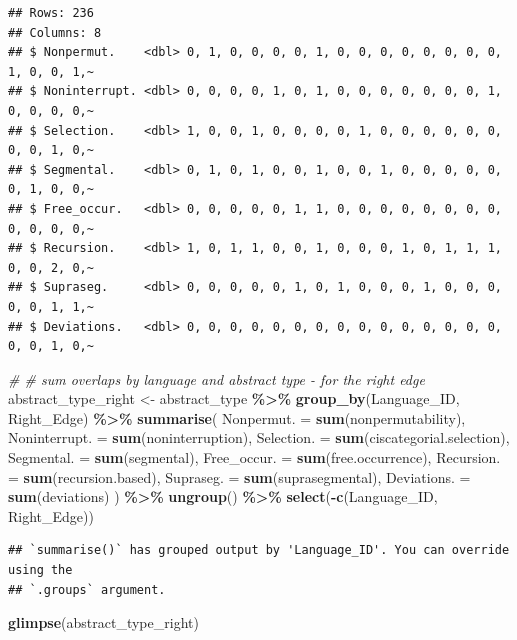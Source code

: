 \documentclass[
]{article}
\newenvironment{Shaded}{\begin{snugshade}}{\end{snugshade}}
\newcommand{\AttributeTok}[1]{\textcolor[rgb]{0.13,0.29,0.53}{#1}}
\newcommand{\CommentTok}[1]{\textcolor[rgb]{0.56,0.35,0.01}{\textit{#1}}}
\newcommand{\FunctionTok}[1]{\textcolor[rgb]{0.13,0.29,0.53}{\textbf{#1}}}
\newcommand{\NormalTok}[1]{#1}
\newcommand{\OtherTok}[1]{\textcolor[rgb]{0.56,0.35,0.01}{#1}}
\newcommand{\SpecialCharTok}[1]{\textcolor[rgb]{0.81,0.36,0.00}{\textbf{#1}}}
\begin{document}
\begin{verbatim}
## Rows: 236
## Columns: 8
## $ Nonpermut.    <dbl> 0, 1, 0, 0, 0, 0, 1, 0, 0, 0, 0, 0, 0, 0, 0, 1, 0, 0, 1,~
## $ Noninterrupt. <dbl> 0, 0, 0, 0, 1, 0, 1, 0, 0, 0, 0, 0, 0, 0, 1, 0, 0, 0, 0,~
## $ Selection.    <dbl> 1, 0, 0, 1, 0, 0, 0, 0, 1, 0, 0, 0, 0, 0, 0, 0, 0, 1, 0,~
## $ Segmental.    <dbl> 0, 1, 0, 1, 0, 0, 1, 0, 0, 1, 0, 0, 0, 0, 0, 0, 1, 0, 0,~
## $ Free_occur.   <dbl> 0, 0, 0, 0, 0, 1, 1, 0, 0, 0, 0, 0, 0, 0, 0, 0, 0, 0, 0,~
## $ Recursion.    <dbl> 1, 0, 1, 1, 0, 0, 1, 0, 0, 0, 1, 0, 1, 1, 1, 0, 0, 2, 0,~
## $ Supraseg.     <dbl> 0, 0, 0, 0, 0, 1, 0, 1, 0, 0, 0, 1, 0, 0, 0, 0, 0, 1, 1,~
## $ Deviations.   <dbl> 0, 0, 0, 0, 0, 0, 0, 0, 0, 0, 0, 0, 0, 0, 0, 0, 0, 1, 0,~
\end{verbatim}

\begin{Shaded}
\begin{Highlighting}[]
\CommentTok{\# \# sum overlaps by language and abstract type {-} for the right edge}
\NormalTok{abstract\_type\_right }\OtherTok{\textless{}{-}}\NormalTok{ abstract\_type }\SpecialCharTok{\%\textgreater{}\%}
  \FunctionTok{group\_by}\NormalTok{(Language\_ID, Right\_Edge) }\SpecialCharTok{\%\textgreater{}\%}
  \FunctionTok{summarise}\NormalTok{(}
    \AttributeTok{Nonpermut. =} \FunctionTok{sum}\NormalTok{(nonpermutability),}
    \AttributeTok{Noninterrupt. =} \FunctionTok{sum}\NormalTok{(noninterruption),}
    \AttributeTok{Selection. =} \FunctionTok{sum}\NormalTok{(ciscategorial.selection),}
    \AttributeTok{Segmental. =} \FunctionTok{sum}\NormalTok{(segmental),}
    \AttributeTok{Free\_occur. =} \FunctionTok{sum}\NormalTok{(free.occurrence),}
    \AttributeTok{Recursion. =} \FunctionTok{sum}\NormalTok{(recursion.based),}
    \AttributeTok{Supraseg. =} \FunctionTok{sum}\NormalTok{(suprasegmental),}
    \AttributeTok{Deviations. =} \FunctionTok{sum}\NormalTok{(deviations)}
\NormalTok{  ) }\SpecialCharTok{\%\textgreater{}\%}
  \FunctionTok{ungroup}\NormalTok{() }\SpecialCharTok{\%\textgreater{}\%}
  \FunctionTok{select}\NormalTok{(}\SpecialCharTok{{-}}\FunctionTok{c}\NormalTok{(Language\_ID, Right\_Edge))}
\end{Highlighting}
\end{Shaded}

\begin{verbatim}
## `summarise()` has grouped output by 'Language_ID'. You can override using the
## `.groups` argument.
\end{verbatim}

\begin{Shaded}
\begin{Highlighting}[]
\FunctionTok{glimpse}\NormalTok{(abstract\_type\_right)}
\end{Highlighting}
\end{Shaded}
\end{document}
